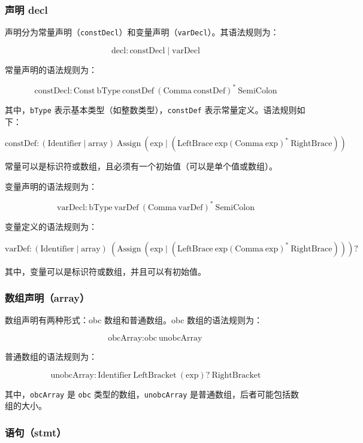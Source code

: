 \documentclass[../main.tex]{subfiles}
\begin{document}
\subsubsection{声明 decl}

声明分为常量声明（\texttt{constDecl}）和变量声明（\texttt{varDecl}）。其语法规则为：

\[
	\text{decl} \colon \text{constDecl} \mid \text{varDecl}
\]

常量声明的语法规则为：

\[
	\text{constDecl} \colon \text{Const} \ \text{bType} \ \text{constDef} \ (\text{Comma} \ \text{constDef})^* \ \text{SemiColon}
\]

其中，\texttt{bType} 表示基本类型（如整数类型），\texttt{constDef} 表示常量定义。语法规则如下：

\[
	\text{constDef} \colon (\text{Identifier} \mid \text{array}) \ \text{Assign} \ (\text{exp} \mid (\text{LeftBrace} \ \text{exp} (\text{Comma} \ \text{exp})^* \ \text{RightBrace}))
\]

常量可以是标识符或数组，且必须有一个初始值（可以是单个值或数组）。

变量声明的语法规则为：

\[
	\text{varDecl} \colon \text{bType} \ \text{varDef} \ (\text{Comma} \ \text{varDef})^* \ \text{SemiColon}
\]

变量定义的语法规则为：

\[
	\text{varDef} \colon (\text{Identifier} \mid \text{array}) \ (\text{Assign} \ (\text{exp} \mid (\text{LeftBrace} \ \text{exp} (\text{Comma} \ \text{exp})^* \ \text{RightBrace})) )?
\]

其中，变量可以是标识符或数组，并且可以有初始值。

\subsubsection{数组声明（array）}

数组声明有两种形式：obc 数组和普通数组。obc 数组的语法规则为：

\[
	\text{obcArray} \colon \text{obc} \ \text{unobcArray}
\]

普通数组的语法规则为：

\[
	\text{unobcArray} \colon \text{Identifier} \ \text{LeftBracket} \ (\text{exp})? \ \text{RightBracket}
\]

其中，\texttt{obcArray} 是 \texttt{obc} 类型的数组，\texttt{unobcArray} 是普通数组，后者可能包括数组的大小。

\subsubsection{语句（stmt）}
\end{document}
